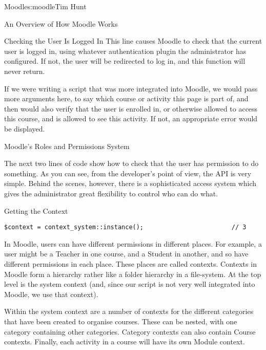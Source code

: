 \begin{aosachapter}{Moodle}{s:moodle}{Tim Hunt}
\begin{aosasect1}{An Overview of How Moodle Works}
\begin{aosasect2}{Checking the User Is Logged In}
This line causes Moodle to check that the current user is logged in,
using whatever authentication plugin the administrator has
configured. If not, the user will be redirected to log in, and this
function will never return.

If we were writing a script that was more integrated into Moodle, we
would pass more arguments here, to say which course or activity this
page is part of, and then  would also verify that
the user is enrolled in, or otherwise allowed to access this course,
and is allowed to see this activity. If not, an appropriate error
would be displayed.

\end{aosasect2}

\end{aosasect1}

\begin{aosasect1}{Moodle's Roles and Permissions System}

The next two lines of code show how to check that the user has
permission to do something. As you can see, from the developer's point
of view, the API is very simple. Behind the scenes, however, there is
a sophisticated access system which gives the administrator great
flexibility to control who can do what.

\begin{aosasect2}{Getting the Context}

\begin{verbatim}
$context = context_system::instance();                        // 3
\end{verbatim}

In Moodle, users can have different permissions in different
places. For example, a user might be a Teacher in one course, and a
Student in another, and so have different permissions in each
place. These places are called contexts. Contexts in Moodle form a
hierarchy rather like a folder hierarchy in a file-system. At the top
level is the system context (and, since our script is not very well
integrated into Moodle, we use that context).

Within the system context are a number of contexts for the different
categories that have been created to organise courses. These can be
nested, with one category containing other categories. Category
contexts can also contain Course contexts. Finally, each activity in a
course will have its own Module context.



\end{aosasect2}
\end{aosasect1}
\end{aosachapter}
